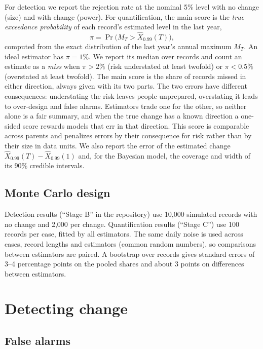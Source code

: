 \documentclass[11pt]{article}
\begin{document}
For detection we report the rejection rate at the nominal 5\% level with no change (size) and with
change (power). For quantification, the main score is the \emph{true exceedance probability} of
each record's estimated level in the last year,
\[
\pi=\Pr\big(M_T>\hat X_{0.99}(T)\big),
\]
computed from the exact distribution of the last year's annual maximum $M_T$. An ideal estimator
has $\pi=1\%$. We report its median over records and count an estimate as a \emph{miss} when
$\pi>2\%$ (risk understated at least twofold) or $\pi<0.5\%$ (overstated at least twofold). The main
score is the share of records missed in either direction, always given with its two parts. The two
errors have different consequences: understating the risk leaves people unprepared, overstating it
leads to over-design and false alarms. Estimators trade one for the other, so neither alone is a fair
summary, and when the true change has a known direction a one-sided score rewards models that err in
that direction. This score is comparable across parents and penalizes errors by their consequence
for risk rather than by their size in data units. We also report the error of the estimated change $\hat X_{0.99}(T)-\hat
X_{0.99}(1)$ and, for the Bayesian model, the coverage and width of its 90\% credible intervals.

\subsection{Monte Carlo design}

Detection results (``Stage B'' in the repository) use 10,000 simulated records with no change
and 2,000 per change. Quantification results (``Stage C'') use 100 records per case, fitted by all
estimators. The same
daily noise is used across cases, record lengths and estimators (common random numbers), so
comparisons between estimators are paired. A bootstrap over records gives standard errors of 3--4
percentage points on the pooled shares and about 3 points on differences between estimators.

\section{Detecting change}

\subsection{False alarms}\label{sec:size}
\end{document}
